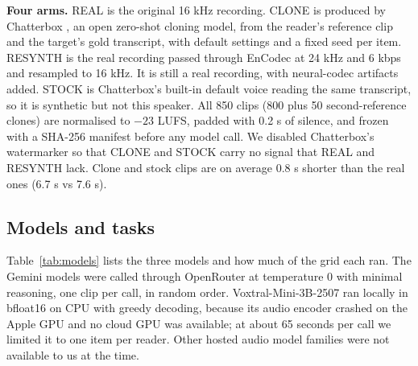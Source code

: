 \textbf{Four arms.} REAL is the original 16 kHz recording. CLONE is produced by Chatterbox \citep{chatterbox}, an open zero-shot cloning model, from the reader's reference clip and the target's gold transcript, with default settings and a fixed seed per item. RESYNTH is the real recording passed through EnCodec at 24 kHz and 6 kbps \citep{a2210_13438} and resampled to 16 kHz. It is still a real recording, with neural-codec artifacts added. STOCK is Chatterbox's built-in default voice reading the same transcript, so it is synthetic but not this speaker. All 850 clips (800 plus 50 second-reference clones) are normalised to $-23$ LUFS, padded with 0.2 s of silence, and frozen with a SHA-256 manifest before any model call. We disabled Chatterbox's watermarker so that CLONE and STOCK carry no signal that REAL and RESYNTH lack. Clone and stock clips are on average 0.8 s shorter than the real ones (6.7 s vs 7.6 s).

\subsection{Models and tasks}

Table~\ref{tab:models} lists the three models and how much of the grid each ran. The Gemini models were called through OpenRouter at temperature 0 with minimal reasoning, one clip per call, in random order. Voxtral-Mini-3B-2507 \citep{a2507_13264} ran locally in bfloat16 on CPU with greedy decoding, because its audio encoder crashed on the Apple GPU and no cloud GPU was available; at about 65 seconds per call we limited it to one item per reader. Other hosted audio model families were not available to us at the time.

\begin{table}[t]
\small
\centering
{}
\caption{Models and coverage. Pro ran 20 readers $\times$ 3 items; Voxtral ran 40 readers $\times$ 1 item.}
\label{tab:models}
\end{table}

